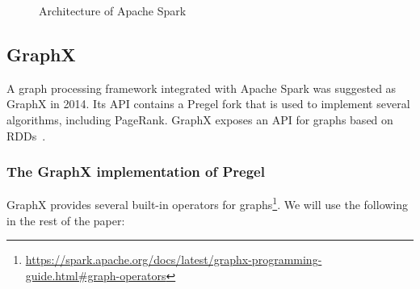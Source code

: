 \begin{figure}[ht]
    \centering
    
    \caption[Architecture of Apache Spark]{Architecture of Apache Spark\footnotemark}
    \label{fig:architecture:apacheSpark}
\end{figure}


\subsection{GraphX}

A graph processing framework integrated with Apache Spark was suggested as GraphX in 2014. Its API contains a Pregel fork that is used to implement several algorithms, including PageRank. GraphX exposes an API for graphs based on RDDs~\cite{https://doi.org/10.48550/arxiv.2110.11709}.

\subsubsection{The GraphX implementation of Pregel}

GraphX provides several built-in operators for graphs\footnote{\url{https://spark.apache.org/docs/latest/graphx-programming-guide.html\#graph-operators}}. We will use the following in the rest of the paper:

